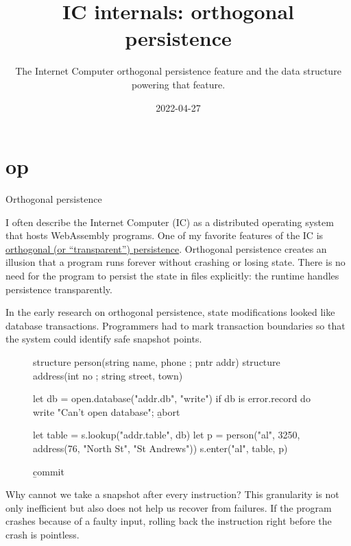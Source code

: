 \documentclass{article}
\title{IC internals: orthogonal persistence}
\subtitle{The Internet Computer orthogonal persistence feature and the data structure powering that feature.}
\date{2022-04-27}
\begin{document}
\section{op}{Orthogonal persistence}

I often describe the Internet Computer (IC) as a distributed operating system that hosts WebAssembly programs.
One of my favorite features of the IC is \href{https://en.wikipedia.org/wiki/Persistence_(computer_science)#Orthogonal_or_transparent_persistence}{orthogonal (or ``transparent'') persistence}.
Orthogonal persistence creates an illusion that a program runs forever without crashing or losing state.
There is no need for the program to persist the state in files explicitly: the runtime handles persistence transparently.

In the early research on orthogonal persistence, state modifications looked like database transactions.
Programmers had to mark transaction boundaries so that the system could identify safe snapshot points.

\begin{figure}
\begin{code}[algol]
structure person(string name, phone ; pntr addr)
structure address(int no ; string street, town)

let db = open.database("addr.db", "write")
if db is error.record do { write "Can't open database"; \b{abort} }

let table = s.lookup("addr.table", db)
let p = person("al", 3250, address(76, "North St", "St Andrews"))
s.enter("al", table, p)

\b{commit}
\end{code}
\end{figure}

Why cannot we take a snapshot after every instruction?
This granularity is not only inefficient but also does not help us recover from failures.
If the program crashes because of a faulty input, rolling back the instruction right before the crash is pointless.
\end{document}
